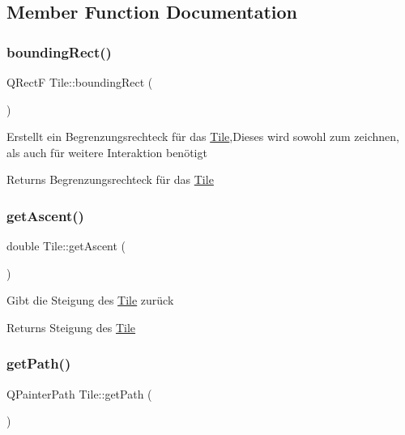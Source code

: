 \subsection{Member Function Documentation}
\mbox{\label{class_tile_a3ffc5a081e722e910f14053fcfb7b00f}} 
\subsubsection{\texorpdfstring{bounding\+Rect()}{boundingRect()}}
{\footnotesize\ttfamily Q\+RectF Tile\+::bounding\+Rect (\begin{DoxyParamCaption}{ }\end{DoxyParamCaption})\hspace{0.3cm}{\ttfamily [virtual]}}

Erstellt ein Begrenzungsrechteck für das \mbox{\hyperlink{class_tile}{Tile}},Dieses wird sowohl zum zeichnen, als auch für weitere Interaktion benötigt \begin{DoxyReturn}{Returns}
Begrenzungsrechteck für das \mbox{\hyperlink{class_tile}{Tile}} 
\end{DoxyReturn}
\mbox{\label{class_tile_a95d921c5d074181603edb6e2e8dd5389}} 
\subsubsection{\texorpdfstring{get\+Ascent()}{getAscent()}}
{\footnotesize\ttfamily double Tile\+::get\+Ascent (\begin{DoxyParamCaption}{ }\end{DoxyParamCaption})}

Gibt die Steigung des \mbox{\hyperlink{class_tile}{Tile}} zurück \begin{DoxyReturn}{Returns}
Steigung des \mbox{\hyperlink{class_tile}{Tile}} 
\end{DoxyReturn}
\mbox{\label{class_tile_a044239c0b2a4a24bf602ddba15ab0a01}} 
\subsubsection{\texorpdfstring{get\+Path()}{getPath()}}
{\footnotesize\ttfamily Q\+Painter\+Path Tile\+::get\+Path (\begin{DoxyParamCaption}{ }\end{DoxyParamCaption})}

